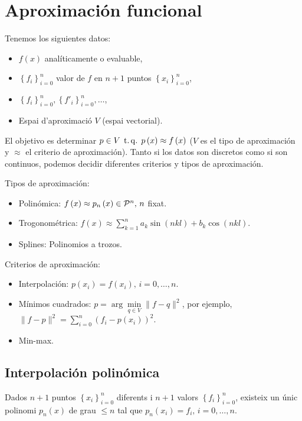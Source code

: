 \chapter{Aproximación funcional}

\noindent Tenemos los siguientes datos:
\begin{itemize}
    \item $f\left( x \right)$ analíticamente o evaluable,
    \item $\left\{ f_i \right\}^n_{i=0}$ valor de $f$ en $n+1$ puntos $\left\{ x_i \right\}^n_{i=0}$,
    \item $\left\{ f_i \right\}^n_{i=0},\left\{ f'_i \right\}^n_{i=0},\dots$,
    \item Espai d'aproximació $V$ (espai vectorial).
\end{itemize}

\noindent El objetivo es determinar $p\in V\operatorname{\;t.q.\;} p\left( x \right) \approx f\left( x \right)$ ($V$ es el tipo de aproximación y $\approx$ el criterio de aproximación). Tanto si los datos son discretos como si son continuos, podemos decidir diferentes criterios y tipos de aproximación. %

\quad

\noindent Tipos de aproximación:
\begin{itemize}
    \item Polinómica: $f\left( x \right)\approx p_n\left( x \right) \in \mathcal{P}^n,\, n$ fixat.
    \item Trogonométrica: $f\left( x \right)\approx \sum\limits^n_{k=1} a_k \sin\left( nkl \right) + b_k \cos\left( nkl \right)$.
    \item Splines: Polinomios a trozos.
\end{itemize}
Criterios de aproximación:
\begin{itemize}
    \item Interpolación: $p\left( x_i \right) = f\left( x_i \right), \, i=0,\dots,n$.
    \item Mínimos cuadrados: $p = \arg\min\limits_{q\in V} \|f-q\|^2$, por ejemplo, $\|f-p\|^2 = \sum\limits^n_{i=0} \left( f_i -p\left( x_i \right) \right)^2$.
    \item Min-max.
\end{itemize}

\section{Interpolación polinómica}

\begin{teo*}
    Dados $n+1$ puntos $\left\{ x_i \right\}^n_{i=0}$ diferents i $n+1$ valors $\left\{ f_i \right\}^n_{i=0}$, existeix un únic polinomi $p_n\left( x \right)$ de grau $\leq n$ tal que $p_n\left( x_i \right) = f_i,\, i=0,\dots,n$.
\end{teo*}

